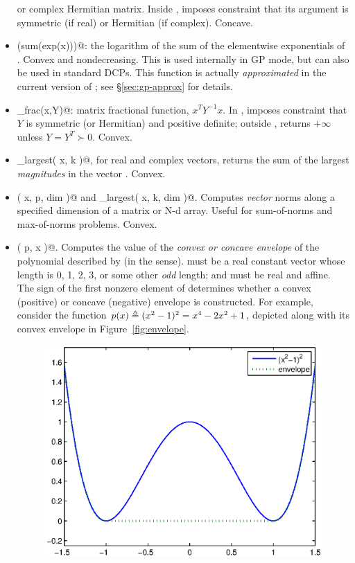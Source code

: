 \documentclass[12pt]{article}
\begin{document}
\begin{itemize}
or complex Hermitian matrix.
Inside \cvx, imposes constraint that its argument 
is symmetric (if real) or Hermitian (if complex).
Concave.
\item \verb@log(sum(exp(x)))@: the
logarithm of the sum of the elementwise exponentials of \verb@x@.
Convex and nondecreasing.
This is used internally in GP mode, but can also be used in standard
DCPs. This function is actually \emph{approximated} in the
current version of \cvx; see \S\ref{sec:gp-approx} for details.
\item \verb@matrix_frac(x,Y)@: matrix fractional function,
$x^TY^{-1}x$.  In \cvx, imposes constraint that $Y$ is 
symmetric (or Hermitian) and positive definite; outside \cvx,
returns $+\infty$ unless $Y=Y^T\succ 0$.
Convex. 
\item \verb@norm_largest( x, k )@, for real and complex vectors,
returns the sum of the largest \verb@k@ \emph{magnitudes} in the
vector \verb@x@.
Convex.
\item \verb@norms( x, p, dim )@ and \verb@norms_largest( x, k, dim )@.
Computes \emph{vector} norms along a specified dimension of a matrix
or N-d array. Useful for sum-of-norms and max-of-norms problems.
Convex.
\item \verb@polyenv( p, x )@. 
Computes the value of the \emph{convex or concave envelope} of the polynomial
described by \verb@p@ (in the \verb@polyval@ sense). \verb@p@ must be
a real constant vector whose length \verb@n@ is 0, 1, 2, 3, or some other
\emph{odd} length; and \verb@x@ must be real and affine. The sign of the
first nonzero element of \verb@p@ determines whether a convex (positive)
or concave (negative) envelope is constructed.
For example, consider the function $p(x)\triangleq (x^2-1)^2=x^4-2x^2+1$,
depicted along with its convex envelope in Figure~\ref{fig:envelope}.
\begin{figure}
\begin{center}
\includegraphics[width=4.5in]{envelope.eps}

\end{center}
\end{figure}
\end{itemize}
\end{document}
